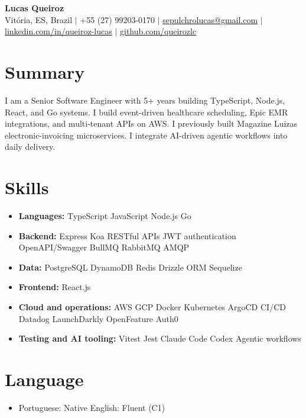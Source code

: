 \documentclass[letterpaper,10pt]{article}
\newcommand{\resumeItem}[1]{\item\small{#1}}
\newcommand{\resumeSubHeadingList}{\begin{itemize}[leftmargin=0.15in, label={}, nosep]}
\newcommand{\resumeSubHeadingListEnd}{\end{itemize}}
\begin{document}
\begin{center}
  \textbf{\Huge Lucas Queiroz} \\[3pt]
  \small Vit\'oria, ES, Brazil $|$ +55 (27) 99203-0170 $|$ \href{mailto:sepulchrolucas@gmail.com}{sepulchrolucas@gmail.com} $|$
  \href{https://linkedin.com/in/queiroz-lucas}{linkedin.com/in/queiroz-lucas} $|$
  \href{https://github.com/queirozlc}{github.com/queirozlc}
\end{center}
\vspace{2pt}

\section{Summary}
I am a Senior Software Engineer with 5+ years building TypeScript, Node.js, React, and Go systems. I build event-driven healthcare scheduling, Epic EMR integrations, and multi-tenant APIs on AWS. I previously built Magazine Luiza\textquotesingle{}s electronic-invoicing microservices. I integrate AI-driven agentic workflows into daily delivery.

\section{Skills}
\resumeSubHeadingList
\resumeItem{\textbf{Languages:} TypeScript \textbar{} JavaScript \textbar{} Node.js \textbar{} Go}
\resumeItem{\textbf{Backend:} Express \textbar{} Koa \textbar{} RESTful APIs \textbar{} JWT authentication \textbar{} OpenAPI/Swagger \textbar{} BullMQ \textbar{} RabbitMQ \textbar{} AMQP}
\resumeItem{\textbf{Data:} PostgreSQL \textbar{} DynamoDB \textbar{} Redis \textbar{} Drizzle ORM \textbar{} Sequelize}
\resumeItem{\textbf{Frontend:} React.js}
\resumeItem{\textbf{Cloud and operations:} AWS \textbar{} GCP \textbar{} Docker \textbar{} Kubernetes \textbar{} ArgoCD \textbar{} CI/CD \textbar{} Datadog \textbar{} LaunchDarkly \textbar{} OpenFeature \textbar{} Auth0}
\resumeItem{\textbf{Testing and AI tooling:} Vitest \textbar{} Jest \textbar{} Claude Code \textbar{} Codex \textbar{} Agentic workflows}\resumeSubHeadingListEnd

\section{Language}
\resumeSubHeadingList
\resumeItem{Portuguese: Native \textbar{} English: Fluent (C1)}
\resumeSubHeadingListEnd
\end{document}
